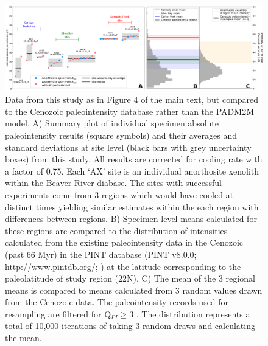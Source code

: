\begin{figure}
\noindent\includegraphics[width=\textwidth]{figure/Zhang2022/Cenozoic_resample_SI.pdf}
\centering
\caption[Comparison between Beaver River anorthosite paleointensity results and compilation of the Cenozoic database]{\footnotesize{Data from this study as in Figure 4 of the main text, but compared to the Cenozoic paleointensity database rather than the PADM2M model. A) Summary plot of individual specimen absolute paleointensity results (square symbols) and their averages and standard deviations at site level (black bars with grey uncertainty boxes) from this study. All results are corrected for cooling rate with a factor of 0.75. Each `AX' site is an individual anorthosite xenolith within the Beaver River diabase. The sites with successful experiments come from 3 regions which would have cooled at distinct times yielding similar estimates within the each region with differences between regions. B) Specimen level means calculated for these regions are compared to the distribution of intensities calculated from the existing paleointensity data in the Cenozoic (past 66 Myr) in the PINT database (PINT v8.0.0; \url{http://www.pintdb.org/}; \citealp{Bono2022a}) at the latitude corresponding to the paleolatitude of study region (22\textdegree N). C) The mean of the 3 regional means is compared to means calculated from 3 random values drawn from the Cenozoic data. The paleointensity records used for resampling are filtered for Q$_{PI} \geq$3 \cite{Biggin2014a}. The distribution represents a total of 10,000 iterations of taking 3 random draws and calculating the mean.}}
\label{fig:SI_Cenozoic_PINT}
\end{figure}

\clearpage

